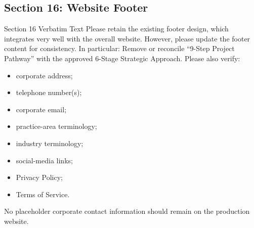 \documentclass[11pt,a4paper]{article}
\begin{document}
\vspace{0.3cm}

\subsection{Section 16: Website Footer}

\begin{VerbatimClientBox}{Section 16 Verbatim Text}
Please retain the existing footer design, which integrates very well with the overall website.
However, please update the footer content for consistency.
In particular:
Remove or reconcile “9-Step Project Pathway” with the approved 6-Stage Strategic Approach.
Please also verify:
\begin{itemize}[noitemsep]
    \item corporate address;
    \item telephone number(s);
    \item corporate email;
    \item practice-area terminology;
    \item industry terminology;
    \item social-media links;
    \item Privacy Policy;
    \item Terms of Service.
\end{itemize}
No placeholder corporate contact information should remain on the production website.
\end{VerbatimClientBox}
\end{document}
